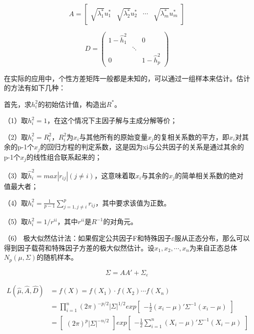 \documentclass[]{ctexbook}
\begin{document}
\[A=\begin {bmatrix}\sqrt{\lambda_1^{\ast}}u_1^{\ast}&\sqrt{\lambda_2^{\ast}}u_2^{\ast}&\cdots&\sqrt{\lambda_m^{\ast}}u_m^{\ast}\end {bmatrix}\]

\[D=\begin {pmatrix}1-\hat h_1^2&&0\\&\ddots&\\0&&1-\hat h_p^2 \end {pmatrix}\]

在实际的应用中，个性方差矩阵一般都是未知的，可以通过一组样本来估计。估计的方法有如下几种：

首先，求\(h_i^2\)的初始估计值，构造出\(R^*\)。

（1）取\(h_i^2=1\)，在这个情况下主因子解与主成分解等价；

（2）取\(h_i^2=R_i^2\)，\(R_i^2\)为\(x_i\)与其他所有的原始变量\(x_j\)的复相关系数的平方，即\(x_i\)对其余的p-1个\(x_j\)的回归方程的判定系数，这是因为xi与公共因子的关系是通过其余的p-1个\(x_j\)的线性组合联系起来的；

（3）取\(\hat h_i^2=max\left|r_{ij}\right|(j\neq i)\)，这意味着取\(x_i\)与其余的\(x_j\)的简单相关系数的绝对值最大者；

（4）取\(h_i^2=\frac{1}{p-1}\sum_{j=1,j\neq i}^pr_{ij}\)，其中要求该值为正数。

（5）取\(h_i^2=1/r^{ii}\)，其中\(r^{ii}\)是\(R^{-1}\)的对角元。

（6） 极大似然估计法：如果假定公共因子F和特殊因子\(\varepsilon\)服从正态分布，那么可以得到因子载荷和特殊因子方差的极大似然估计。设\(x_1,x_2,\cdots,x_n\)为来自正态总体\(N_p(\mu,\Sigma)\)的随机样本。

\[\Sigma=AA'+\Sigma_{\varepsilon}\]

\[\begin {aligned} L(\hat \mu,\hat A,\hat D)&=f(X)=f(X_1)\cdot f(X_2)\cdots f(X_n)\\&=\prod_{i=1}^n(2\pi)^{-p/2}\left |\Sigma\right|^{1/2}exp\begin {bmatrix}-\frac{1}{2}(x_i-\mu)'\Sigma^{-1}(x_i-\mu) \end {bmatrix}\\&=\begin {bmatrix}(2\pi)^p\left |\Sigma \right |^{-n/2} \end {bmatrix}exp\begin {bmatrix}-\frac{1}{2}\sum_{i=1}^n(X_i-\mu)'\Sigma^{-1}(X_i-\mu) \end {bmatrix} \end {aligned}\]
\end{document}
